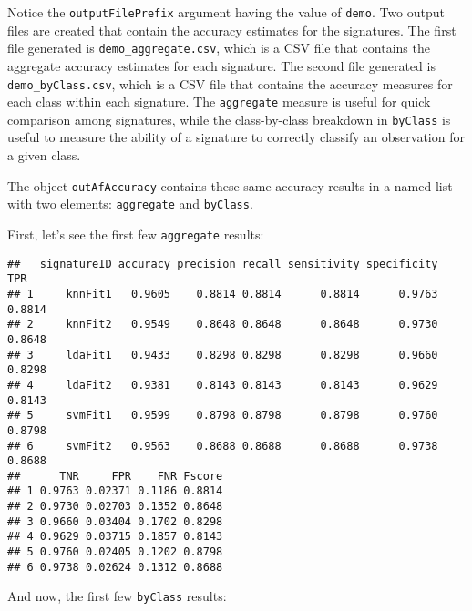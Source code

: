 \documentclass{article}
\makeatletter
\newenvironment{kframe}{%
 \def\FrameCommand##1{\hskip\@totalleftmargin \hskip-\fboxsep
 \colorbox{shadecolor}{##1}\hskip-\fboxsep
     \hskip-\linewidth \hskip-\@totalleftmargin \hskip\columnwidth}%
 \MakeFramed {\advance\hsize-\width
   \@totalleftmargin\z@ \linewidth\hsize
   \@setminipage}}%
 {\par\unskip\endMakeFramed}
\newenvironment{knitrout}{}{} %
\makeatother
\begin{document}
Notice the {\tt outputFilePrefix} argument having the value of {\tt demo}. Two
output files are created that contain the accuracy estimates for the signatures.
The first file generated is {\tt demo\_aggregate.csv}, which is a CSV file that
contains the aggregate accuracy estimates for each signature. The second file
generated is {\tt demo\_byClass.csv}, which is a CSV file that contains the
accuracy measures for each class within each signature. The {\tt aggregate}
measure is useful for quick comparison among signatures, while the class-by-class
breakdown in {\tt byClass} is useful to measure the ability of a signature to
correctly classify an observation for a given class.

The object {\tt outAfAccuracy} contains these same accuracy results in a named
list with two elements: {\tt aggregate} and {\tt byClass}.

First, let's see the first few {\tt aggregate} results:

\begin{knitrout}
\color{fgcolor}\begin{kframe}
\begin{verbatim}
##   signatureID accuracy precision recall sensitivity specificity    TPR
## 1     knnFit1   0.9605    0.8814 0.8814      0.8814      0.9763 0.8814
## 2     knnFit2   0.9549    0.8648 0.8648      0.8648      0.9730 0.8648
## 3     ldaFit1   0.9433    0.8298 0.8298      0.8298      0.9660 0.8298
## 4     ldaFit2   0.9381    0.8143 0.8143      0.8143      0.9629 0.8143
## 5     svmFit1   0.9599    0.8798 0.8798      0.8798      0.9760 0.8798
## 6     svmFit2   0.9563    0.8688 0.8688      0.8688      0.9738 0.8688
##      TNR     FPR    FNR Fscore
## 1 0.9763 0.02371 0.1186 0.8814
## 2 0.9730 0.02703 0.1352 0.8648
## 3 0.9660 0.03404 0.1702 0.8298
## 4 0.9629 0.03715 0.1857 0.8143
## 5 0.9760 0.02405 0.1202 0.8798
## 6 0.9738 0.02624 0.1312 0.8688
\end{verbatim}
\end{kframe}
\end{knitrout}


And now, the first few {\tt byClass} results:
\end{document}
